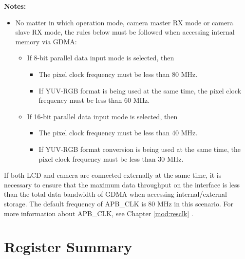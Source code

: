 \documentclass[main\_\_EN.tex]{subfiles}
\begin{document}
\textbf{Notes:}
\begin{itemize}
    \item No matter in which operation mode, camera master RX mode or camera slave RX mode, the rules below must be followed when accessing internal memory via GDMA:
\begin{itemize}

    \item If 8-bit parallel data input mode is selected, then
        \begin{itemize}
        \item The pixel clock frequency must be less than 80 MHz.
        \item If YUV-RGB format is being used at the same time, the pixel clock frequency must be less than 60 MHz.
    \end{itemize}
    \item If 16-bit parallel data input mode is selected, then
        \begin{itemize}
        \item The pixel clock frequency must be less than 40 MHz.
        \item If YUV-RGB format conversion is being used at the same time, the pixel clock frequency must be less than 30 MHz.
    \end{itemize}
\end{itemize}
\end{itemize}

\begin{tiplisting}
   If both LCD and camera are connected externally at the same time, it is necessary to ensure that the maximum data throughput on the interface is less than the total data bandwidth of GDMA when accessing internal/external storage. The default frequency of APB\_CLK is 80 MHz in this scenario. For more information about APB\_CLK, see Chapter \ref{mod:resclk} \textit{}.
\end{tiplisting}




\newpage
\hypertarget{camlcdctrl-reg-summ}{}
\section{Register Summary}
\label{sec:camlcdctrl-reg-summ}
\end{document}
